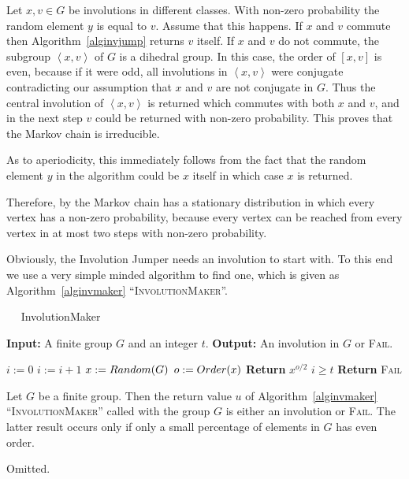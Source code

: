 Let $x,v \in G$ be involutions in different classes. With non-zero 
probability the random element $y$ is equal to $v$. Assume that this
happens. If $x$ and $v$
commute then Algorithm~\ref{alginvjump} returns $v$ itself. 
If $x$ and $v$ do not commute, the subgroup
$\left< x,v \right>$ of $G$ is a dihedral group. In this case, the
order of $[x,v]$ is even, because if it were odd, all involutions
in $\left< x,v \right>$ were conjugate contradicting our assumption
that $x$ and $v$ are not conjugate in $G$. Thus the
central involution of $\left< x,v \right>$ is returned which commutes
with both $x$ and $v$, and in the next step $v$ could be returned with
non-zero probability. This proves that the Markov chain is
irreducible.

As to aperiodicity, this immediately follows from the fact that the
random element $y$ in the algorithm could be $x$ itself in which case
$x$ is returned.

Therefore, by \cite[Theorem 2.2.1]{Ser} the Markov chain has a
stationary distribution in which every vertex has a non-zero
probability, because every vertex can be reached from every vertex in
at most two steps with non-zero probability.
\proofend

\smallskip
Obviously, the Involution Jumper needs an
involution to start with. To this end we use a very simple minded
algorithm to find one, which is given as Algorithm~\ref{alginvmaker}
``\textsc{InvolutionMaker}''.

\begin{algorithm}
\caption{$\quad$ \sc InvolutionMaker}
%
\label{alginvmaker}
\begin{algorithmic}
\STATE \textbf{Input:} A finite group $G$ and an integer $t$.
\STATE \textbf{Output:} An involution in $G$ or \textsc{Fail}.

\smallskip
\STATE $i := 0$
\REPEAT
    \STATE $i := i + 1$
    \STATE $x := \textsc{Random}(G)$ \hspace*{10mm} 
    \STATE $o := \textsc{Order}(x)$
        \STATE \textbf{Return} $x^{o/2}$
    \ENDIF
\UNTIL $i \ge t$
\STATE \textbf{Return} \textsc{Fail}
\end{algorithmic}
\end{algorithm}

\begin{Prop}
%
Let $G$ be a finite group. Then the return value $u$ of 
Algorithm~\ref{alginvmaker} ``\textsc{InvolutionMaker}'' 
called with the group $G$ is either
an involution or \textsc{Fail}. The latter result occurs only if
only a small percentage of elements in $G$ has even order.
\end{Prop}
\proofbeg Omitted.
\proofend

